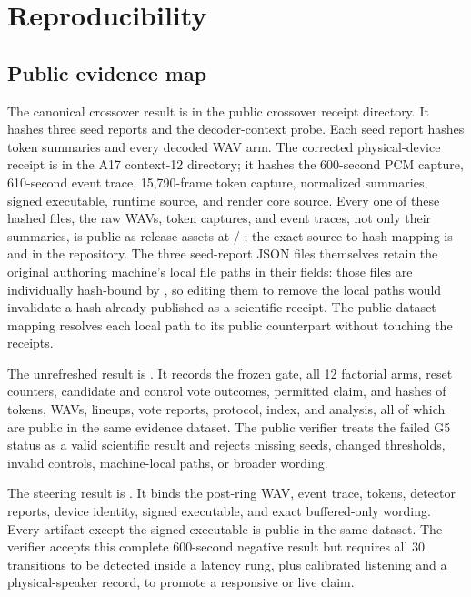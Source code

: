 \documentclass[10pt]{article}
\begin{document}
\appendix
\section{Reproducibility}
\subsection{Public evidence map}
The canonical crossover result is \texttt{} in the public crossover receipt directory. It hashes three seed reports and the decoder-context probe. Each seed report hashes token summaries and every decoded WAV arm. The corrected physical-device receipt is \texttt{} in the A17 context-12 directory; it hashes the 600-second PCM capture, 610-second event trace, 15,790-frame token capture, normalized summaries, signed executable, runtime source, and render core source. Every one of these hashed files, the raw WAVs, token captures, and event traces, not only their summaries, is public as release assets at \texttt{} / \texttt{}; the exact source-to-hash mapping is \texttt{} and \texttt{} in the repository. The three seed-report JSON files themselves retain the original authoring machine's local file paths in their \texttt{} fields: those files are individually hash-bound by \texttt{}, so editing them to remove the local paths would invalidate a hash already published as a scientific receipt. The public dataset mapping resolves each local path to its public counterpart without touching the receipts.

The unrefreshed result is \texttt{}. It records the frozen gate, all 12 factorial arms, reset counters, candidate and control vote outcomes, permitted claim, and hashes of tokens, WAVs, lineups, vote reports, protocol, index, and analysis, all of which are public in the same evidence dataset. The public verifier treats the failed G5 status as a valid scientific result and rejects missing seeds, changed thresholds, invalid controls, machine-local paths, or broader wording.

The steering result is \texttt{}. It binds the post-ring WAV, event trace, tokens, detector reports, device identity, signed executable, and exact buffered-only wording. Every artifact except the signed executable is public in the same dataset. The verifier accepts this complete 600-second negative result but requires all 30 transitions to be detected inside a latency rung, plus calibrated listening and a physical-speaker record, to promote a responsive or live claim.
\end{document}
